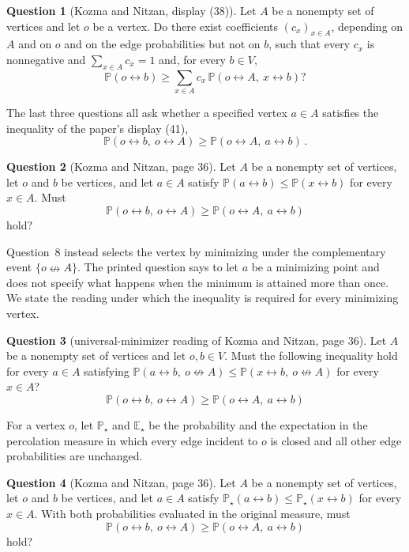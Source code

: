 \documentclass[11pt]{article}
\theoremstyle{definition}
\newtheorem{question}{Question}
\theoremstyle{remark}
\newcommand{\PP}{\mathbb P}
\newcommand{\EE}{\mathbb E}
\newcommand{\con}{\leftrightarrow}
\newcommand{\ncon}{\nleftrightarrow}
\begin{document}
\setcounter{question}{4}
\begin{question}[Kozma and Nitzan, display (38)]\label{q5}
Let $A$ be a nonempty set of vertices and let $o$ be a vertex. Do there exist coefficients
$(c_x)_{x\in A}$, depending on $A$ and on $o$ and on the edge probabilities but not on $b$, such
that every $c_x$ is nonnegative and $\sum_{x\in A}c_x=1$ and, for every $b\in V$,
\[
 \PP(o\con b)\geq \sum_{x\in A}c_x\,\PP(o\con A,\ x\con b)?
\]
\end{question}

The last three questions all ask whether a specified vertex $a\in A$ satisfies the
inequality of the paper's display (41),
\begin{equation}\label{eq:41}
 \PP(o\con b,\ o\con A)\geq \PP(o\con A,\ a\con b)\,.
\end{equation}

\setcounter{question}{6}
\begin{question}[Kozma and Nitzan, page 36]\label{q7}
Let $A$ be a nonempty set of vertices, let $o$ and $b$ be vertices, and let $a\in A$
satisfy $\PP(a\con b)\leq\PP(x\con b)$ for every $x\in A$. Must
\[
 \PP(o\con b,\ o\con A)\geq \PP(o\con A,\ a\con b)
\]
hold?
\end{question}

Question~8 instead selects the vertex by minimizing under the complementary event
$\{o\ncon A\}$. The printed question says to let $a$ be a minimizing point and does not
specify what happens when the minimum is attained more than once. We state the reading
under which the inequality is required for every minimizing vertex.

\begin{question}[universal-minimizer reading of Kozma and Nitzan, page 36]\label{q8}
Let $A$ be a nonempty set of vertices and let $o,b\in V$. Must the following inequality
hold for every $a\in A$ satisfying
$\PP(a\con b,\ o\ncon A)\leq\PP(x\con b,\ o\ncon A)$ for every $x\in A$?
\[
 \PP(o\con b,\ o\con A)\geq \PP(o\con A,\ a\con b)
\]
\end{question}

For a vertex $o$, let $\PP_\star$ and $\EE_\star$ be the probability and the expectation in
the percolation measure in which every edge incident to $o$ is closed and all other edge
probabilities are unchanged.

\begin{question}[Kozma and Nitzan, page 36]\label{q9}
Let $A$ be a nonempty set of vertices, let $o$ and $b$ be vertices, and let $a\in A$
satisfy $\PP_\star(a\con b)\leq\PP_\star(x\con b)$ for every $x\in A$. With both
probabilities evaluated in the
original measure, must
\[
 \PP(o\con b,\ o\con A)\geq \PP(o\con A,\ a\con b)
\]
hold?
\end{question}
\end{document}
